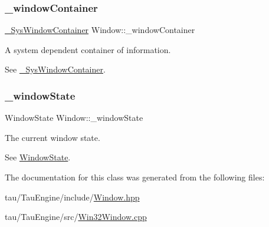 \subsubsection{\texorpdfstring{\+\_\+window\+Container}{\_windowContainer}}
{\footnotesize\ttfamily \mbox{\hyperlink{struct___sys_window_container}{\+\_\+\+Sys\+Window\+Container}} Window\+::\+\_\+window\+Container\hspace{0.3cm}{\ttfamily [private]}}

A system dependent container of information.

See \mbox{\hyperlink{struct___sys_window_container}{\+\_\+\+Sys\+Window\+Container}}. \mbox{\label{class_window_a43c5622f0faf50873784dceb427e4e4f}} 
\subsubsection{\texorpdfstring{\+\_\+window\+State}{\_windowState}}
{\footnotesize\ttfamily Window\+State Window\+::\+\_\+window\+State\hspace{0.3cm}{\ttfamily [private]}}

The current window state.

See \mbox{\hyperlink{}{Window\+State}}. 

The documentation for this class was generated from the following files\+:\begin{DoxyCompactItemize}
\item 
tau/\+Tau\+Engine/include/\mbox{\hyperlink{_window_8hpp}{Window.\+hpp}}\item 
tau/\+Tau\+Engine/src/\mbox{\hyperlink{_win32_window_8cpp}{Win32\+Window.\+cpp}}\end{DoxyCompactItemize}
